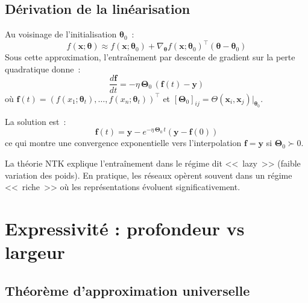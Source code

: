 \subsection{D\'erivation de la lin\'earisation}

\begin{mathbox}[title=\textbf{Lin\'earisation de Taylor du r\'eseau}]
Au voisinage de l'initialisation $\boldsymbol{\theta}_0$~:
\begin{equation}
f(\mathbf{x}; \boldsymbol{\theta}) \approx f(\mathbf{x}; \boldsymbol{\theta}_0) + \nabla_{\boldsymbol{\theta}} f(\mathbf{x}; \boldsymbol{\theta}_0)^\top (\boldsymbol{\theta} - \boldsymbol{\theta}_0)
\end{equation}
Sous cette approximation, l'entra\^inement par descente de gradient sur la
perte quadratique donne~:
\begin{equation}
\frac{d\mathbf{f}}{dt} = -\eta\,\boldsymbol{\Theta}_0\,(\mathbf{f}(t) - \mathbf{y})
\end{equation}
o\`u $\mathbf{f}(t) = (f(x_1; \boldsymbol{\theta}_t), \ldots, f(x_n; \boldsymbol{\theta}_t))^\top$
et $[\boldsymbol{\Theta}_0]_{ij} = \Theta(\mathbf{x}_i, \mathbf{x}_j)\big|_{\boldsymbol{\theta}_0}$.

La solution est~:
\begin{equation}
\mathbf{f}(t) = \mathbf{y} - e^{-\eta\,\boldsymbol{\Theta}_0\,t}(\mathbf{y} - \mathbf{f}(0))
\end{equation}
ce qui montre une convergence exponentielle vers l'interpolation $\mathbf{f} = \mathbf{y}$
si $\boldsymbol{\Theta}_0 \succ 0$.
\end{mathbox}

\begin{remarque}
La th\'eorie NTK explique l'entra\^inement dans le r\'egime dit <<~lazy~>>
(faible variation des poids). En pratique, les r\'eseaux op\`erent souvent
dans un r\'egime <<~riche~>> o\`u les repr\'esentations \'evoluent
significativement.
\end{remarque}

\section{Expressivit\'e : profondeur vs largeur}
\label{sec:expressivity}

\subsection{Th\'eor\`eme d'approximation universelle}

